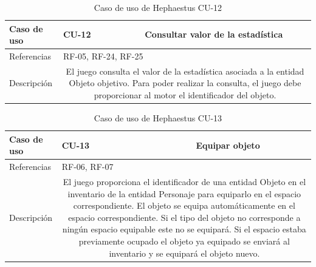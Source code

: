\begin{table}[H]
	\centering
	\small
	\begin{tabularx}{\linewidth}{|l|cc|}
		\hline
		{\cellcolor[HTML]{C0C0C0} Caso de uso} & \multicolumn{1}{l|}{CU-12} & Consultar valor de la estadística \\ \hline
		{\cellcolor[HTML]{C0C0C0} Referencias} & \multicolumn{2}{l|}{RF-05, RF-24, RF-25} \\ \hline
		{\cellcolor[HTML]{C0C0C0} Descripción} & \multicolumn{2}{X|}{El juego consulta el valor de la estadística asociada a la entidad Objeto objetivo. Para poder realizar la consulta, el juego debe proporcionar al motor el identificador del objeto.} \\ \hline
	\end{tabularx}
	
	\vspace{0.5cm}
	\caption{Caso de uso de Hephaestus CU-12}
	\label{tab:hephaestus-cu-12}
\end{table}

\begin{table}[H]
	\centering
	\small
	\begin{tabularx}{\linewidth}{|l|cc|}
		\hline
		{\cellcolor[HTML]{C0C0C0} Caso de uso} & \multicolumn{1}{l|}{CU-13} & Equipar objeto \\ \hline
		{\cellcolor[HTML]{C0C0C0} Referencias} & \multicolumn{2}{l|}{RF-06, RF-07} \\ \hline
		{\cellcolor[HTML]{C0C0C0} Descripción} & \multicolumn{2}{X|}{El juego proporciona el identificador de una entidad Objeto en el inventario de la entidad Personaje para equiparlo en el espacio correspondiente. El objeto se equipa automáticamente en el espacio correspondiente. Si el tipo del objeto no corresponde a ningún espacio equipable este no se equipará. Si el espacio estaba previamente ocupado el objeto ya equipado se enviará al inventario y se equipará el objeto nuevo.} \\ \hline
	\end{tabularx}
	
	\vspace{0.5cm}
	\caption{Caso de uso de Hephaestus CU-13}
	\label{tab:hephaestus-cu-13}
\end{table}

